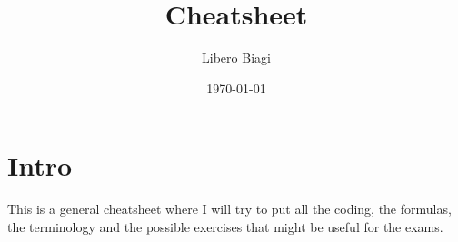 \documentclass[a4paper,10pt]{article}
\begin{document}
\title{Cheatsheet}
\author{Libero Biagi}

\date{\today}
\maketitle

\section*{Intro}
This is a general cheatsheet where I will try to put all the coding, the formulas, the terminology and the possible exercises that might be useful for the exams.

\tableofcontents





\end{document}
